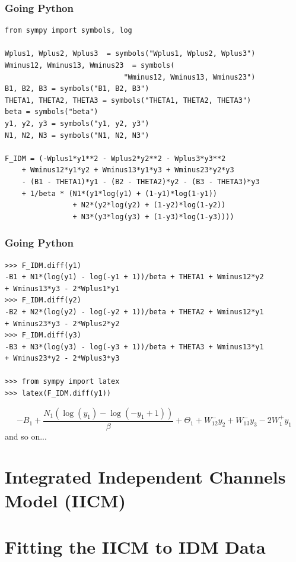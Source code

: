 \documentclass[xcolor={fixpdftex,hyperref,x11names},10pt,pdftex,hyperref={pdftex}]{beamer}
\begin{document}
\begin{frame}[fragile]
  \frametitle{Going Python}
  \begin{verbatim}
from sympy import symbols, log

Wplus1, Wplus2, Wplus3  = symbols("Wplus1, Wplus2, Wplus3")
Wminus12, Wminus13, Wminus23  = symbols(
                            "Wminus12, Wminus13, Wminus23")
B1, B2, B3 = symbols("B1, B2, B3")
THETA1, THETA2, THETA3 = symbols("THETA1, THETA2, THETA3")
beta = symbols("beta")
y1, y2, y3 = symbols("y1, y2, y3")
N1, N2, N3 = symbols("N1, N2, N3")

F_IDM = (-Wplus1*y1**2 - Wplus2*y2**2 - Wplus3*y3**2
    + Wminus12*y1*y2 + Wminus13*y1*y3 + Wminus23*y2*y3
    - (B1 - THETA1)*y1 - (B2 - THETA2)*y2 - (B3 - THETA3)*y3
    + 1/beta * (N1*(y1*log(y1) + (1-y1)*log(1-y1))
                + N2*(y2*log(y2) + (1-y2)*log(1-y2))
                + N3*(y3*log(y3) + (1-y3)*log(1-y3))))
  \end{verbatim}
\end{frame}

\begin{frame}[fragile]
  \frametitle{Going Python}
  \begin{verbatim}
>>> F_IDM.diff(y1)
-B1 + N1*(log(y1) - log(-y1 + 1))/beta + THETA1 + Wminus12*y2
+ Wminus13*y3 - 2*Wplus1*y1
>>> F_IDM.diff(y2)
-B2 + N2*(log(y2) - log(-y2 + 1))/beta + THETA2 + Wminus12*y1
+ Wminus23*y3 - 2*Wplus2*y2
>>> F_IDM.diff(y3)
-B3 + N3*(log(y3) - log(-y3 + 1))/beta + THETA3 + Wminus13*y1
+ Wminus23*y2 - 2*Wplus3*y3

>>> from sympy import latex
>>> latex(F_IDM.diff(y1))
  \end{verbatim}
$$- B_{1} + \frac{N_{1} (\operatorname{log}(y_{1}) -
\operatorname{log}(- y_{1} + 1))}{\beta} + \Theta_{1} +
W^-_{12} y_{2} + W^-_{13} y_{3} - 2 W^+_{1} y_{1}$$
and so on...
\end{frame}


\section{Integrated Independent Channels Model (IICM)}
\label{sec:iicm}





\section{Fitting the IICM to IDM Data}
\label{sec:fitting}
\end{document}
